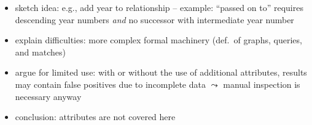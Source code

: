 \begin{itemize}
  \item
    sketch idea: e.g., add year to relationship  -- example: ``passed on to'' requires descending year numbers \emph{and} no successor with intermediate year number
  \item
    explain difficulties: more complex formal machinery (def.\ of graphs, queries, and matches)
  \item
    argue for limited use: with or without the use of additional attributes, results may contain false positives due to incomplete data $\leadsto$ manual inspection is necessary anyway
  \item
    conclusion: attributes are not covered here
\end{itemize}

